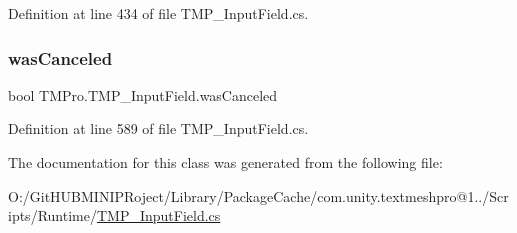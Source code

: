 Definition at line 434 of file T\+M\+P\+\_\+\+Input\+Field.\+cs.

\mbox{\label{class_t_m_pro_1_1_t_m_p___input_field_a6f9abe7ff08ce17ffece2dc9a6df3ae9}} 
\subsubsection{\texorpdfstring{wasCanceled}{wasCanceled}}
{\footnotesize\ttfamily bool T\+M\+Pro.\+T\+M\+P\+\_\+\+Input\+Field.\+was\+Canceled\hspace{0.3cm}{\ttfamily [get]}}



Definition at line 589 of file T\+M\+P\+\_\+\+Input\+Field.\+cs.



The documentation for this class was generated from the following file\+:\begin{DoxyCompactItemize}
\item 
O\+:/\+Git\+H\+U\+B\+M\+I\+N\+I\+P\+Roject/\+Library/\+Package\+Cache/com.\+unity.\+textmeshpro@1../\+Scripts/\+Runtime/\mbox{\hyperlink{_t_m_p___input_field_8cs}{T\+M\+P\+\_\+\+Input\+Field.\+cs}}\end{DoxyCompactItemize}
